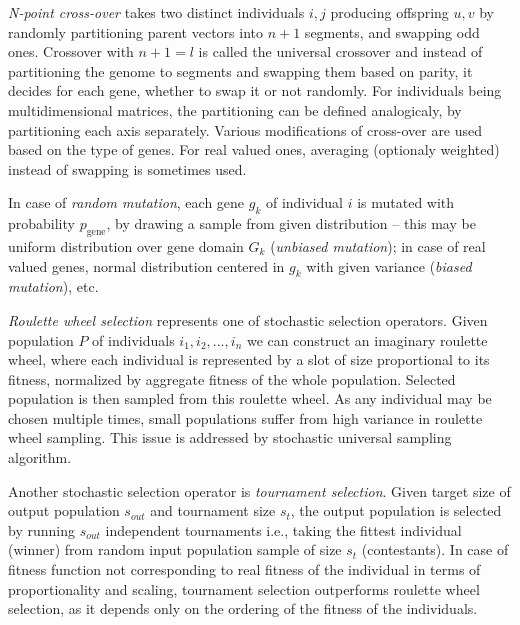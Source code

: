 \emph{N-point cross-over} takes two distinct individuals $i, j$ producing offspring $u, v$ by randomly partitioning parent vectors into $n+1$ segments, and swapping odd ones. Crossover with $n + 1 = l$ is called the universal crossover and instead of partitioning the genome to segments and swapping them based on parity, it decides for each gene, whether to swap it or not randomly. For individuals being multidimensional matrices, the partitioning can be defined analogicaly, by partitioning each axis separately. Various modifications of cross-over are used based on the type of genes. For real valued ones, averaging (optionaly weighted) instead of swapping is sometimes used.

In case of \emph{random mutation}, each gene $g_k$ of individual $i$ is mutated with probability $p_{\text{gene}}$, by drawing a sample from given distribution -- this may be uniform distribution over gene domain $G_k$ (\emph{unbiased mutation}); in case of real valued genes, normal distribution centered in $g_k$ with given variance (\emph{biased mutation}), etc.

\emph{Roulette wheel selection} represents one of stochastic selection operators. Given population $P$ of individuals $i_1, i_2, \dots, i_n$ we can construct an imaginary roulette wheel, where each individual is represented by a slot of size proportional to its fitness, normalized by aggregate fitness of the whole population. Selected population is then sampled from this roulette wheel. As any individual may be chosen multiple times, small populations suffer from high variance in roulette wheel sampling. This issue is addressed by stochastic universal sampling algorithm.

Another stochastic selection operator is \emph{tournament selection}. Given target size of output population $s_{out}$ and tournament size $s_t$, the output population is selected by running $s_{out}$ independent tournaments i.e., taking the fittest individual (winner) from random input population sample of size $s_t$ (contestants). In case of fitness function not corresponding to real fitness of the individual in terms of proportionality and scaling, tournament selection outperforms roulette wheel selection, as it depends only on the ordering of the fitness of the individuals.
